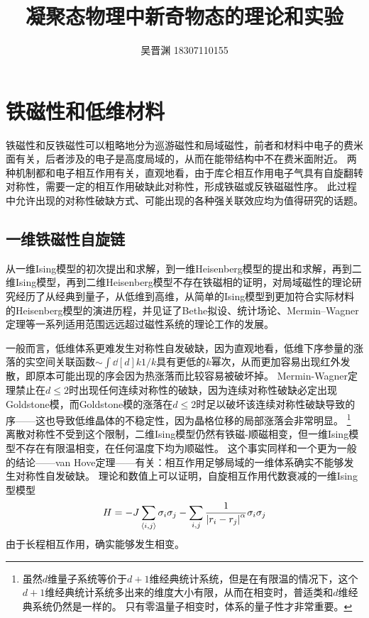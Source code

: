\documentclass[hyperref, UTF8]{ctexart}
\title{凝聚态物理中新奇物态的理论和实验}
\author{吴晋渊 18307110155}
\newcommand*{\pair}[1]{\langle #1 \rangle}
\begin{document}
\maketitle

\section{铁磁性和低维材料}

铁磁性和反铁磁性可以粗略地分为巡游磁性和局域磁性，前者和材料中电子的费米面有关，后者涉及的电子是高度局域的，从而在能带结构中不在费米面附近。
两种机制都和电子相互作用有关\cite{annurev.ms.14.080184.000245,Cleveland_1976}，直观地看，由于库仑相互作用电子气具有自旋翻转对称性，需要一定的相互作用破缺此对称性，形成铁磁或反铁磁磁性序。
此过程中允许出现的对称性破缺方式、可能出现的各种强关联效应均为值得研究的话题。

\subsection{一维铁磁性自旋链}

从一维Ising模型的初次提出和求解\cite{ising1925beitrag}，到一维Heisenberg模型的提出和求解\cite{Bethe_1931}，再到二维Ising模型\cite{onsager1944crystal}，再到二维Heisenberg模型不存在铁磁相的证明\cite{PhysRevLett.17.1133}，对局域磁性的理论研究经历了从经典到量子，从低维到高维，从简单的Ising模型到更加符合实际材料的Heisenberg模型的演进历程，并见证了Bethe拟设、统计场论、Mermin–Wagner定理等一系列适用范围远远超过磁性系统的理论工作的发展。

一般而言，低维体系更难发生对称性自发破缺，因为直观地看，低维下序参量的涨落的实空间关联函数$\sim \int \dd[d]{k} 1/k$具有更低的$k$幂次，从而更加容易出现红外发散，即原本可能出现的序会因为热涨落而比较容易被破坏掉。
Mermin-Wagner定理禁止在$d \leq 2$时出现任何连续对称性的破缺，因为连续对称性破缺必定出现Goldstone模，而Goldstone模的涨落在$d \leq 2$时足以破坏该连续对称性破缺导致的序——这也导致低维晶体的不稳定性，因为晶格位移的局部涨落会非常明显\cite{landau-symmetry}。%
\footnote{
    虽然$d$维量子系统等价于$d+1$维经典统计系统，但是在有限温的情况下，这个$d+1$维经典统计系统多出来的维度大小有限，从而在相变时，普适类和$d$维经典系统仍然是一样的。
    只有零温量子相变时，体系的量子性才非常重要。
}%
离散对称性不受到这个限制，二维Ising模型仍然有铁磁-顺磁相变，但一维Ising模型不存在有限温相变，在任何温度下均为顺磁性。
这个事实同样和一个更为一般的结论——van Hove定理——有关：相互作用足够局域的一维体系确实不能够发生对称性自发破缺\cite{Cuesta_2004}。
理论和数值上可以证明，自旋相互作用代数衰减的一维Ising型模型
\begin{equation}
    H = - J \sum_{\pair{i, j}} \sigma_i \sigma_j - \sum_{i, j} \frac{1}{\abs{r_i - r_j}^\alpha} \sigma_i \sigma_j
\end{equation}
由于长程相互作用，确实能够发生相变\cite{PhysRevB.54.R12661}。
\end{document}
